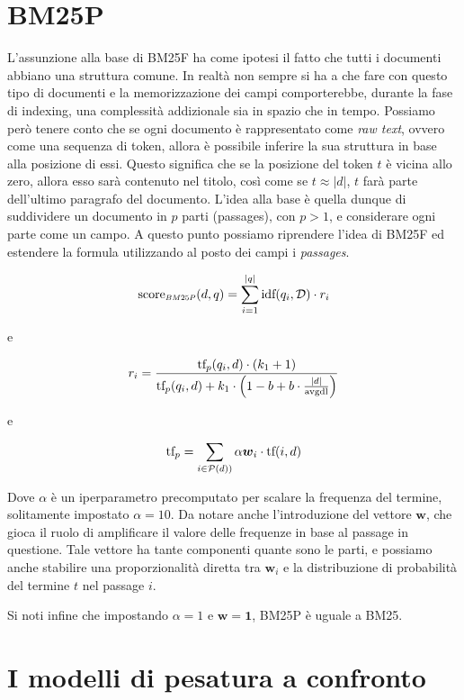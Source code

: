 \section{BM25P}
L'assunzione alla base di BM25F ha come ipotesi il fatto che tutti i documenti abbiano una struttura comune.
In realtà non sempre si ha a che fare con questo tipo di documenti e la memorizzazione dei campi comporterebbe, durante
la fase di indexing, una complessità addizionale sia in spazio che in tempo.
Possiamo però tenere conto che se ogni documento è rappresentato come \textit{raw text}, ovvero come una sequenza
di token, allora è possibile inferire la sua struttura in base alla posizione di essi.
Questo significa che se la posizione del token $t$ è vicina allo zero, allora esso sarà contenuto nel titolo, così come
se $t \approx \left|d\right|$, $t$ farà parte dell'ultimo paragrafo del documento.
L'idea alla base è quella dunque di suddividere un documento in $p$ parti (passages), con $p>1$, e
considerare ogni parte come un campo. A questo punto possiamo riprendere l'idea di BM25F
ed estendere la formula utilizzando al posto dei campi i \textit{passages}.

\begin{definizione}[BM25 Passages]\label{def:bm25p}
		$$
	\sco_{\scaleto{BM25P}{4pt}}(d, q) = \sum_{i=1}^{|q|} \text{idf}(q_i, \mathcal{D}) \cdot r_i
	$$
	
	e
	
	$$
	r_i = \frac{
		\text{tf}_p(q_i, d) \cdot (k_1 +1)
	}{
		\text{tf}_p(q_i, d) + k_1 \cdot \left(1-b + b \cdot \frac{\left|d\right|}{\text{avgdl}}\right)
	}
	$$
	
	e
	
	$$
	\text{tf}_p = \sum_{i \in \mathcal{P}(d))}{\alpha \boldsymbol{w}_i \cdot \text{tf}(i, d)}
	$$
	
	Dove $\alpha$ è un iperparametro precomputato per scalare la frequenza del termine, solitamente impostato $\alpha = 10$.
	Da notare anche l'introduzione del vettore $\boldsymbol{w}$, che gioca il ruolo di amplificare il valore delle frequenze
	in base al passage in questione.
	Tale vettore ha tante componenti quante sono le parti, e possiamo anche stabilire una proporzionalità
	diretta tra $\boldsymbol{w}_i$ e la distribuzione di probabilità del termine $t$ nel passage $i$.
	
	Si noti infine che impostando $\alpha=1$ e $\boldsymbol{w} = \boldsymbol{1}$, BM25P è uguale a BM25.
\end{definizione}

\section{I modelli di pesatura a confronto}
 
